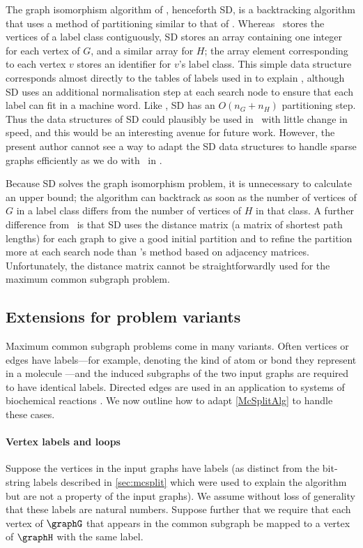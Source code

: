 The graph isomorphism algorithm of \citet{DBLP:journals/jacm/SchmidtD76},
henceforth SD, is a backtracking algorithm that uses a method of partitioning
similar to that of \McSplit. Whereas \McSplit\ stores the vertices of a label
class contiguously, SD stores an array containing one integer for each vertex
of $G$, and a similar array for $H$; the array element corresponding to each
vertex $v$ stores an identifier for $v$'s label class.  This simple data
structure corresponds almost directly to the tables of labels used in
 to explain \McSplit, although SD uses an
additional normalisation step at each search node to ensure that each label can
fit in a machine word.  Like \McSplit, SD has an $O(n_G + n_H)$ partitioning
step. Thus the data structures of SD could plausibly be used in \McSplit\ with
little change in speed, and this would be an interesting avenue for future
work.  However, the present author cannot see a way to adapt the SD data
structures to handle sparse graphs efficiently as we do with \McSplit\ in
.

Because SD solves the
graph isomorphism problem, it is unnecessary to calculate an upper bound; the
algorithm can backtrack as soon as the number of vertices of $G$ in a label
class differs from the number of vertices of $H$ in that class.  A further
difference from \McSplit\ is that SD uses
the distance matrix (a matrix of shortest path lengths) for each
graph to give a good initial partition and to refine the partition more at each
search node than \McSplit's method based on adjacency matrices. Unfortunately,
the distance matrix cannot be straightforwardly used for the maximum common
subgraph problem.

\subsection{Extensions for problem variants}\label{sec:extensions}

Maximum common subgraph problems come in many variants. Often
vertices or edges have labels---for example, denoting the kind of atom or bond they represent in
a molecule \citep{Ehrlich:2011}---and the induced subgraphs of the two input graphs are
required to have identical labels.  Directed edges are used in an application to systems
of biochemical reactions \citep{DAM2014}.
We now outline how to adapt \cref{McSplitAlg} to handle these cases.

\paragraph{Vertex labels and loops} Suppose the vertices in the input graphs have labels
(as distinct from the bit-string labels described in \cref{sec:mcsplit} which were used to
explain the algorithm but are not a property of the input graphs). We assume without loss
of generality that these labels are natural numbers. Suppose further that
we require that each vertex of $\graphG$ that appears in the common subgraph be mapped to a vertex
of $\graphH$ with the same label.

